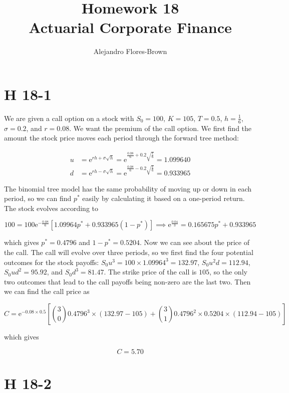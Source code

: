 \documentclass[12pt, letterpaper]{article}
\title{Homework 18 \\ Actuarial Corporate Finance}
\author{Alejandro Flores-Brown}
\newcommand{\e}{\mathrm{e}}
\begin{document}
    \maketitle

    \section{H 18-1}

    We are given a call option on a stock with \(S_0 = 100\), \(K = 105\), \(T = 0.5\), \(h = \frac{1}{6}\), \(\sigma = 0.2\), and \(r = 0.08\). We want the premium of the call option. We first find the amount the stock price moves each period through the forward tree method:
    
    \begin{align*}
    u &= \e^{rh + \sigma \sqrt{h}} = \e^{\frac{0.08}{6} + 0.2 \sqrt{\frac{1}{6}}} = 1.099640 \\
    d &= \e^{rh - \sigma \sqrt{h}} = \e^{\frac{0.08}{6} - 0.2 \sqrt{\frac{1}{6}}} = 0.933965
    \end{align*}

    The binomial tree model has the same probability of moving up or down in each period, so we can find \(p^*\) easily by calculating it based on a one-period return. The stock evolves according to

    \[ 100 = 100 \e^{-\frac{0.08}{6}} \left[ 1.09964 p^* + 0.933965 (1 - p^*) \right] \implies \e^{\frac{0.04}{3}} = 0.165675 p^* + 0.933965 \]

    which gives \(p^* = 0.4796 \) and \(1 - p^* = 0.5204\). Now we can see about the price of the call. The call will evolve over three periods, so we first find the four potential outcomes for the stock payoffs: \(S_0 u^3 = 100 \times 1.09964^3 = 132.97\), \(S_0 u^2 d = 112.94\), \(S_0 u d^2 = 95.92\), and \(S_0 d^3 = 81.47\). The strike price of the call is \(105\), so the only two outcomes that lead to the call payoffs being non-zero are the last two. Then we can find the call price as

    \[ C = \e^{-0.08 \times 0.5} \left[ \binom{3}{0} 0.4796^3 \times (132.97 - 105) + \binom{3}{1} 0.4796^2 \times 0.5204 \times (112.94 - 105) \right]   \]

    which gives

    \[ \boxed{C = 5.70}    \]





    \section{H 18-2}
\end{document}
